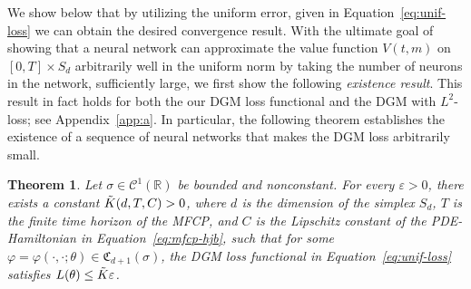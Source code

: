 \documentclass[11pt,reqno]{amsart}
\numberwithin{equation}{section}
\theoremstyle{plain}
\newtheorem{theorem}{Theorem}[section]
\newcommand{\R}{\mathbb{R}}
\newcommand{\sC}{\mathcal{C}}
\begin{document}
We show below that by utilizing the uniform error, given in Equation~\eqref{eq:unif-loss} 
we can obtain the desired convergence result. With the ultimate goal of showing that a neural network can approximate the value function $V(t, m)$ on $[0, T] \times S_d$ arbitrarily well in the uniform norm by taking
the number of neurons in the network, sufficiently large, we first show the following {\it existence result}. This result in fact holds for both the our DGM loss functional and the DGM with $L^2$-loss; see Appendix~\ref{app:a}. In particular, the following theorem establishes the existence of a sequence of neural networks that makes the DGM loss arbitrarily small.
\begin{theorem}
\label{th:unif-error-conv}
Let $\sigma \in \sC^1(\R)$ be bounded and nonconstant. For every $\varepsilon > 0$, there exists a constant $\Tilde{K}(d, T, C) > 0$, where $d$ is the dimension of the simplex $S_d$, $T$ is the finite time horizon of the MFCP, and $C$ is the Lipschitz constant of the PDE-Hamiltonian in Equation~\eqref{eq:mfcp-hjb}, such that for some $\varphi=\varphi(\cdot,\cdot;\theta) \in \mathfrak{C}_{d+1}(\sigma)$, the DGM loss functional in Equation~\eqref{eq:unif-loss} satisfies $L(\theta) \leq \Tilde{K} \varepsilon$.
\end{theorem}
\end{document}
